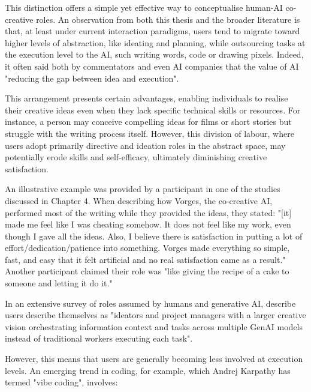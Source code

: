 This distinction offers a simple yet effective way to conceptualise human-AI co-creative roles. An observation from both this thesis and the broader literature is that, at least under current interaction paradigms, users tend to migrate toward higher levels of abstraction, like ideating and planning, while outsourcing tasks at the execution level to the AI, such writing words, code or drawing pixels. Indeed, it often said both by commentators and even AI companies that the value of AI "reducing the gap between idea and execution".

This arrangement presents certain advantages, enabling individuals to realise their creative ideas even when they lack specific technical skills or resources. For instance, a person may conceive compelling ideas for films or short stories but struggle with the writing process itself. However, this division of labour, where users adopt primarily directive and ideation roles in the abstract space, may potentially erode skills and self-efficacy, ultimately diminishing creative satisfaction.

An illustrative example was provided by a participant in one of the studies discussed in Chapter 4. When describing how Vorges, the co-creative AI, performed most of the writing while they provided the ideas, they stated: "[it] made me feel like I was cheating somehow. It does not feel like my work, even though I gave all the ideas. Also, I believe there is satisfaction in putting a lot of effort/dedication/patience into something. Vorges made everything so simple, fast, and easy that it felt artificial and no real satisfaction came as a result." Another participant claimed their role was "like giving the recipe of a cake to someone and letting it do it."


In an extensive survey of roles assumed by humans and generative AI, \cite{Palani2024-on} describe users describe themselves as "ideators and project managers with a larger creative vision orchestrating information context and tasks across multiple GenAI models instead of traditional workers executing each task". 

However, this means that users are generally becoming less involved at execution levels. An emerging trend in coding, for example, which Andrej Karpathy has termed "vibe coding", involves: 

